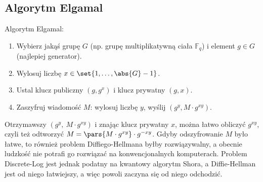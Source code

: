 \subsection{Algorytm Elgamal}
\begin{greyframe}
	Algorytm Elgamal:
	\begin{enumerate}
		\item Wybierz jakąś grupę \( G \) (np. grupę multiplikatywną ciała \( \mathbb{F}_q \)) i element \( g \in G \) \\ (najlepiej generator).
		\item Wylosuj liczbę \( x \in \set{1, \ldots, \abs{G}-1} \).
		\item Ustal klucz publiczny \( (g,g^x) \) i klucz prywatny \( (g,x) \).
		\item Zaszyfruj wiadomość \( M \): wylosuj liczbę \( y \), wyślij \( (g^y, M \cdot g^{xy}) \).
	\end{enumerate}
\end{greyframe}
Otrzymawszy \( (g^y, \ M \cdot g^{xy}) \) i znając klucz prywatny \( x \), można łatwo obliczyć \( g^{xy} \), czyli też odtworzyć \( M = \pars{M \cdot g^{xy}} \cdot g^{-xy} \).
Gdyby odszyfrowanie \( M \) było łatwe, to również problem Diffiego-Hellmana byłby rozwiązywalny, a obecnie ludzkość nie potrafi go rozwiązać na konwencjonalnych komputerach. Problem Discrete-Log jest jednak podatny na kwantowy algorytm Shora, a Diffie-Hellman jest od niego łatwiejszy, a więc powoli zaczyna się od niego odchodzić.